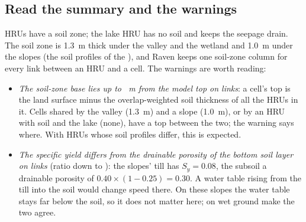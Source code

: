 \subsection{Read the summary and the warnings}
 HRUs have a soil zone; the lake HRU has no soil and keeps the seepage drain. The soil zone is 1.3~m thick under the
valley and the wetland and 1.0~m under the slopes (the soil profiles of the ), and Raven keeps one soil-zone
column for every link between an HRU and a cell. The  warnings are worth reading:
\begin{itemize}
\item \emph{The soil-zone base lies up to ~m from the model top on  links}: a cell's top is
      the land surface minus the overlap-weighted soil thickness of all the HRUs in it. Cells shared by the valley
      (1.3~m) and a slope (1.0~m), or by an HRU with soil and the lake (none), have a top between the two; the warning says
      where. With HRUs whose soil profiles differ, this is expected.
\item \emph{The specific yield differs from the drainable porosity of the bottom soil layer on  links}
      (ratio down to ): the slopes' till has $S_y=0.08$, the subsoil a drainable porosity of
      $0.40\times(1-0.25)=0.30$. A water table rising from the till into the soil would change speed there. On these slopes the
      water table stays far below the soil, so it does not matter here; on wet ground make the two agree.
\end{itemize}

